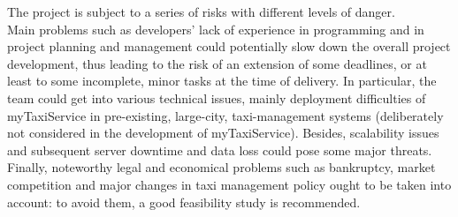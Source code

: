 The project is subject to a series of risks with different levels of danger.\\
Main problems such as developers' lack of experience in programming and in project planning and management could potentially slow down the overall project development, thus leading to the risk of an extension of some deadlines, or at least to some incomplete, minor tasks at the time of delivery.
In particular, the team could get into various technical issues, mainly deployment difficulties of myTaxiService in pre-existing, large-city, taxi-management systems (deliberately not considered in the development of myTaxiService). Besides, scalability issues and subsequent server downtime and data loss could pose some major threats.
Finally, noteworthy legal and economical problems such as bankruptcy, market competition and major changes in taxi management policy ought to be taken into account: to avoid them, a good feasibility study is recommended.